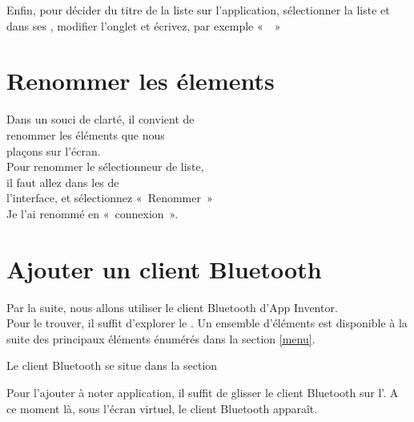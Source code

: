 
Enfin, pour décider du titre de la liste sur l'application, sélectionner la liste  et dans ses , modifier l'onglet  et écrivez, par exemple «  »


\section{Renommer les élements}

Dans un souci de clarté, il convient de \\ renommer les éléments que nous \\ plaçons sur l'écran. \\

Pour renommer le sélectionneur de liste,\\ il faut allez dans les  de \\l'interface,  et sélectionnez  « Renommer » \\
Je l'ai renommé en « connexion ».






\section{Ajouter un client Bluetooth} \label{bluetooth_install}

Par la suite, nous allons utiliser le client Bluetooth d'App Inventor. \\
Pour le trouver, il suffit d'explorer le . Un ensemble d'éléments est disponible à la suite des principaux éléments énumérés dans la section \ref{menu}.


Le client Bluetooth se situe dans la section 

Pour l'ajouter à noter application, il suffit de glisser le client Bluetooth sur l'.
A ce moment là, sous l'écran virtuel, le client Bluetooth apparaît.

